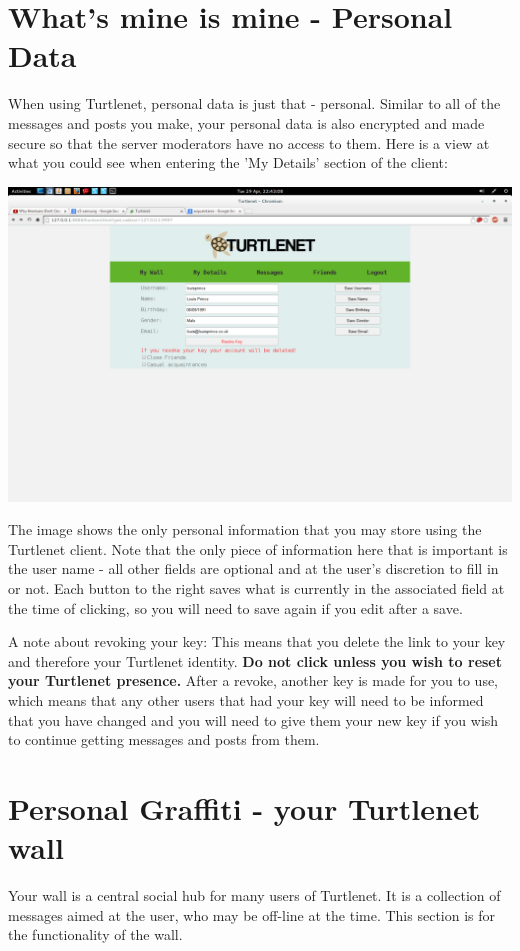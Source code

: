 \section{What's mine is mine - Personal Data}
When using Turtlenet, personal data is just that - personal.  Similar to all of
the messages and posts you make, your personal data is also encrypted and made
secure so that the server moderators have no access to them.  Here is a view at
what you could see when entering the 'My Details' section of the client:

\includegraphics[scale=0.2]{../Screenshots/Screenshot from 2014-04-29 22-43-08}

The image shows the only personal information that you may store using the
Turtlenet client.  Note that the only piece of information here that is 
important is the user name - all other fields are optional and at the user's
discretion to fill in or not.  Each button to the right saves what is currently
in the associated field at the time of clicking, so you will need to save again
if you edit after a save.

A note about revoking your key:  This means that you delete the link to your
key and therefore your Turtlenet identity.
\textbf{Do not click unless you wish to reset your Turtlenet presence.}
After a revoke, another key is made for you to use, which means that any other
users that had your key will need to be informed that you have changed and you
will need to give them your new key if you wish to continue getting messages 
and posts from them.

\section{Personal Graffiti - your Turtlenet wall}
Your wall is a central social hub for many users of Turtlenet.  It is a
collection of messages aimed at the user, who may be off-line at the time.
This section is for the functionality of the wall.

